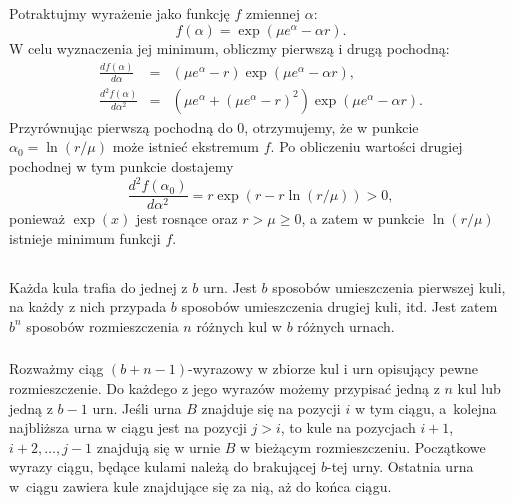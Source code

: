 \subsection{} %
Potraktujmy wyrażenie jako funkcję $f$ zmiennej $\alpha$:
\[
	f(\alpha) = \exp(\mu e^\alpha-\alpha r).
\]
W celu wyznaczenia jej minimum, obliczmy pierwszą i drugą pochodną:
\begin{eqnarray*}
	\frac{df(\alpha)}{d\alpha} &=& (\mu e^\alpha-r)\exp(\mu e^\alpha-\alpha r), \\
	\frac{d^2f(\alpha)}{d\alpha^2} &=& \left(\mu e^\alpha+(\mu e^\alpha-r)^2\right)\exp(\mu e^\alpha-\alpha r).
\end{eqnarray*}
Przyrównując pierwszą pochodną do $0$, otrzymujemy, że w punkcie $\alpha_0=\ln(r/\mu)$ może istnieć ekstremum $f$. Po obliczeniu wartości drugiej pochodnej w tym punkcie dostajemy
\[
	\frac{d^2f(\alpha_0)}{d\alpha^2} = r\exp(r-r\ln(r/\mu))>0,
\]
ponieważ $\exp(x)$ jest rosnące oraz $r>\mu\ge 0$, a zatem w punkcie $\ln(r/\mu)$ istnieje minimum funkcji $f$.

\problems

\subsection{} %

\subsubsection{} %
Każda kula trafia do jednej z $b$ urn. Jest $b$ sposobów umieszczenia pierwszej kuli, na każdy z nich przypada $b$ sposobów umieszczenia drugiej kuli, itd. Jest zatem $b^n$ sposobów rozmieszczenia $n$ różnych kul w $b$ różnych urnach.

\subsubsection{} %
Rozważmy ciąg $(b+n-1)$-wyrazowy w zbiorze kul i urn opisujący pewne rozmieszczenie. Do każdego z jego wyrazów możemy przypisać jedną z $n$ kul lub jedną z $b-1$ urn. Jeśli urna $B$ znajduje się na pozycji $i$ w tym ciągu, a~kolejna najbliższa urna w ciągu jest na pozycji $j>i$, to kule na pozycjach $i+1$, $i+2,\dots,j-1$ znajdują się w urnie $B$ w bieżącym rozmieszczeniu. Początkowe wyrazy ciągu, będące kulami należą do brakującej $b$-tej urny. Ostatnia urna w~ciągu zawiera kule znajdujące się za nią, aż do końca ciągu.


